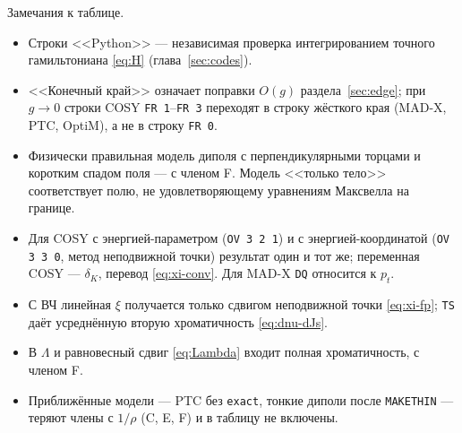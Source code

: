 Замечания к таблице.
\begin{itemize}
\item Строки <<Python>> --- независимая проверка интегрированием точного гамильтониана \eqref{eq:H} (глава~\ref{sec:codes}).
\item <<Конечный край>> означает поправки $O(g)$ раздела~\ref{sec:edge}; при $g\to0$ строки COSY \texttt{FR 1}--\texttt{FR 3} переходят в строку жёсткого края (MAD-X, PTC, OptiM), а не в строку \texttt{FR 0}.
\item Физически правильная модель диполя с перпендикулярными торцами и коротким спадом поля --- с членом F. Модель <<только тело>> соответствует полю, не удовлетворяющему уравнениям Максвелла на границе.
\item Для COSY с энергией-параметром (\texttt{OV 3 2 1}) и с энергией-координатой (\texttt{OV 3 3 0}, метод неподвижной точки) результат один и тот же; переменная COSY --- $\delta_K$, перевод \eqref{eq:xi-conv}. Для MAD-X \texttt{DQ} относится к $p_t$.
\item С ВЧ линейная $\xi$ получается только сдвигом неподвижной точки \eqref{eq:xi-fp}; \texttt{TS} даёт усреднённую вторую хроматичность \eqref{eq:dnu-dJs}.
\item В $\Lambda$ и равновесный сдвиг \eqref{eq:Lambda} входит полная хроматичность, с членом F.
\item Приближённые модели --- PTC без \texttt{exact}, тонкие диполи после \texttt{MAKETHIN} --- теряют члены с $1/\rho$ (C, E, F) и в таблицу не включены.
\end{itemize}
